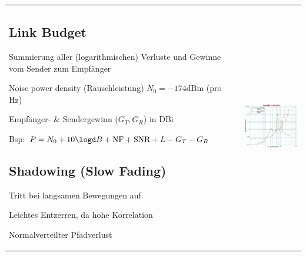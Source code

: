 \begin{tabular}{ll}
\parbox{11cm}{
	\subsection{Link Budget }
	\begin{liste}
	    \item Summierung aller (logarithmischen) Verluste und Gewinne vom Sender
	    zum Empfänger
	    \item Noise power density (Rauschleistung) $N_0 = -174\text{dBm}$ (pro Hz)
	    \item Empfänger- \& Sendergewinn ($G_T, G_R$) in DBi
	    \item Bsp: $P=N_0+10 \logd B+\text{NF}+\text{SNR}+L-G_T-G_R$
	\end{liste}

	\subsection{Shadowing (Slow Fading) }
	\begin{liste}
	    \item Tritt bei langsamen Bewegungen auf
	    \item Leichtes Entzerren, da hohe Korrelation
	    \item Normalverteilter Pfadverlust
	\end{liste}
    }
& \parbox{7cm}{
    \includegraphics[width=7cm]{./bilder/propagation-atmospheric-absorption.png}}
\end{tabular}

